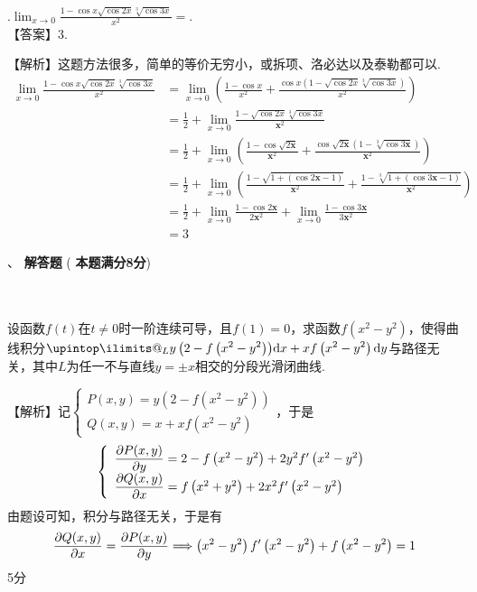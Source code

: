\documentclass[11pt,twoside]{ctexart}
\makeatletter
\newlength{\wot}
\newcounter{ns}
\newcounter{ts}
\newcounter{nq}
\newcommand{\wns}{\stepcounter{ns}\CJKnumber{\thens}、}
\newcommand{\wq}{\stepcounter{nq}\thenq.}
\newcommand{\tbs}{\begin{tabular}{|c|c|c|}\hline \makebox[\wot]{得分}&\makebox[\wot]{评卷人}&\makebox[\wot]{复核人}\\ \hline
		& &\\ \hline\end{tabular}}
\newcommand{\ws}[2]{\raisebox{-1ex}{\begin{minipage}[b]{4.6\wot}\tbs\end{minipage}}
	\begin{minipage}[t]{\textwidth-6\wot} {\heiti \wns #1 } #2 \end{minipage} }
\newcommand{\upint}{\DOTSI\upintop\ilimits@}
\newcommand{\zfrac}[2]{\dfrac{{\raisebox{-0.7mm}{$#1$}}}{\;{\raisebox{0.2mm}{$#2$}}\;}}
\makeatother
\begin{document}
\wq $\displaystyle\lim_{x\rightarrow 0}\displaystyle\frac{1-\cos x\sqrt{\cos 2x}\sqrt[3]{\cos 3x}}{x^2}=$\underline{\hspace{3em}}.\\
【答案】3.

【解析】这题方法很多，简单的等价无穷小，或拆项、洛必达以及泰勒都可以.
\begin{align*}
\lim_{x\rightarrow 0}\frac{1-\cos x\sqrt{\cos 2x}\sqrt[3]{\cos 3x}}{x^2}&=\lim_{x\rightarrow 0}\left(\frac{1-\cos x}{x^2}+\frac{\cos x\left(1-\sqrt{\cos 2x}\sqrt[3]{\cos 3x}\right)}{x^2}\right)\\
&=\frac{1}{2}+\lim_{x\rightarrow 0}\frac{1-\sqrt{\cos 2x}\sqrt[3]{\cos 3x}}{\boldsymbol{x}^2}\\
&=\frac{1}{2}+\lim_{x\rightarrow 0}\left(\frac{1-\cos\sqrt{2\boldsymbol{x}}}{\boldsymbol{x}^2}+\frac{\cos\sqrt{2\boldsymbol{x}}\left(1-\sqrt[3]{\cos 3\boldsymbol{x}}\right)}{\boldsymbol{x}^2}\right)\\
&=\frac{1}{2}+\lim_{x\rightarrow 0}\left(\frac{1-\sqrt{1+\left(\cos 2\boldsymbol{x}-1\right)}}{\boldsymbol{x}^2}+\frac{1-\sqrt[3]{1+\left(\cos 3\boldsymbol{x}-1\right)}}{\boldsymbol{x}^2}\right)\\
&=\frac{1}{2}+\lim_{x\rightarrow 0}\frac{1-\cos 2\boldsymbol{x}}{2\boldsymbol{x}^2}+\lim_{x\rightarrow 0}\frac{1-\cos 3\boldsymbol{x}}{3\boldsymbol{x}^2}\\
&=3
\end{align*}



\newpage
\ws { \textbf{解答题}}{(\textbf{ 本题满分8分})\\}\\\\
设函数$f(t)$在$t\ne 0$时一阶连续可导，且$f(1)=0$，求函数$f(x^2-y^2)$，使得曲线积分$\displaystyle \upint_L{y\left(2-f\left(x^2-y^2\right)\right)}\mathrm {d}x+xf\left(x^2-y^2\right)\mathrm{d}y
$与路径无关，其中$L$为任一不与直线$y=\pm x$相交的分段光滑闭曲线.

【解析】记$\left\{ \begin{array} { l } { P ( x , y ) = y \left( 2 - f \left( x ^ { 2 } - y ^ { 2 } \right) \right) } \\
 {Q ( x , y ) = x + x f \left( x ^ { 2 } - y ^ { 2 } \right) } \end{array} \right.$，于是
\[\left\{ \begin{array} { l } { \zfrac { \partial P ( x , y ) } { \partial y } = 2 - f \left( x ^ { 2 } - y ^ { 2 } \right) + 2 y ^ { 2 } f ^ { \prime } \left( x ^ { 2 } - y ^ { 2 } \right) } \\ 
{ \zfrac { \partial Q ( x , y ) } { \partial x } = f \left( x ^ { 2 } + y ^ { 2 } \right) + 2 x ^ { 2 } f ^ { \prime } \left( x ^ { 2 } - y ^ { 2 } \right) } \end{array} \right.\]
由题设可知，积分与路径无关，于是有
\[\zfrac { \partial Q ( x , y ) } { \partial x } = \zfrac { \partial P ( x , y ) } { \partial y } \Longrightarrow \left( x ^ { 2 } - y ^ { 2 } \right) f ^ { \prime } \left( x ^ { 2 } - y ^ { 2 } \right) + f \left( x ^ { 2 } - y ^ { 2 } \right) = 1\]
\hfill\dotfill 5分
\end{document}
